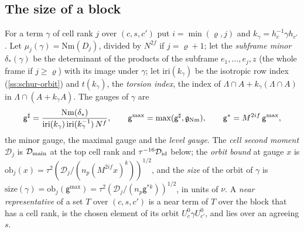 \subsection{The size of a block}\label{ss:block-size}
For a term $\gamma$ of cell rank $j$ over $(c,s,c')$ put $i=\min(\varrho,j)$ and $k_\gamma=h_c^{-1}\gamma h_{c'}$. Let $\mu_j(\gamma)=\mathrm{Nm}(D_j)$, divided by $N^{2f}$ if $j=\varrho+1$; let the \emph{subframe minor} $\delta_*(\gamma)$ be the
determinant of the products of the subframe $e_1,\dots,e_j,z$ (the whole frame if $j\ge\varrho$) with its image under $\gamma$; let $\mathrm{iri}(k_\gamma)$ be the isotropic row index (\cref{ss:schur-orbit}) and
$t(k_\gamma)$, the \emph{torsion index}, the index of $\Lambda\cap A+k_\gamma(\Lambda\cap A)$ in $\Lambda\cap(A+k_\gamma A)$. The gauges of $\gamma$ are
\[
  \mathsf g^\sharp=\frac{\mathrm{Nm}(\delta_*)}{\mathrm{iri}(k_\gamma)\,\mathrm{iri}(k_\gamma^{-1})\,N^f},\qquad\mathsf g^{\max}=\max(\mathsf g^\sharp,\mathfrak g_{\rm Nm}),\qquad\mathsf g^*=M^{2if}\,\mathsf g^{\max},
\]
the minor gauge, the maximal gauge and the \emph{level gauge}. The \emph{cell second moment} $\mathcal D_j$ is $\mathcal D_{\rm main}$ at the top cell rank and $\tau^{-16}\mathcal D_{\rm id}$ below; the \emph{orbit bound} at gauge $x$ is
$\mathrm{ob}_j(x)=\tau^2(\mathcal D_j/(n_p(M^{2if}x)^k))^{1/2}$, and the \emph{size} of the orbit of $\gamma$ is $\mathrm{size}(\gamma)=\mathrm{ob}_j(\mathsf g^{\max})=\tau^2(\mathcal D_j/(n_p\mathsf g^{*k}))^{1/2}$, in units of $\nu$. A
\emph{near representative} of a set $T$ over $(c,s,c')$ is a near term of $T$ over the block that has a cell rank, is the chosen element of its orbit $U^0_c\gamma U^0_{c'}$, and lies over an agreeing $s$.

